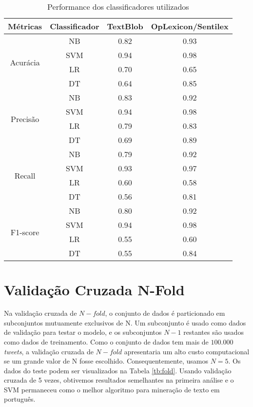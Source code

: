  
 \begin{table}[htbp]
     \centering
     \caption{Performance dos classificadores utilizados}
     \label{tb:metricas}
     \begin{tabular}{@{}cccc@{}}
     \\    \hline
     Métricas & Classificador & TextBlob & OpLexicon/Sentilex \\  \hline
     \multirow{4}{*}{Acurácia} & NB & 0.82 & 0.93 \\  
      & SVM & 0.94 & 0.98 \\ 
      & LR & 0.70 & 0.65 \\
      & DT & 0.64 & 0.85 \\ \hline
     \multirow{4}{*}{Precisão} & NB & 0.83 & 0.92 \\ 
      & SVM & 0.94 & 0.98 \\ 
      & LR & 0.79 & 0.83 \\ 
      & DT & 0.69 & 0.89 \\ \hline
     \multirow{4}{*}{Recall} & NB & 0.79 & 0.92 \\ 
      & SVM & 0.93 & 0.97 \\ 
      & LR & 0.60 & 0.58 \\ 
      & DT & 0.56 & 0.81 \\ \hline
     \multirow{4}{*}{F1-score} & NB & 0.80 & 0.92 \\ 
      & SVM & 0.94 & 0.98 \\ 
      & LR & 0.55 & 0.60 \\ 
      & DT & 0.55 & 0.84 \\ \hline
     \end{tabular}
     \end{table}
     
 \section{Validação Cruzada N-Fold}
 
 Na validação cruzada de $N-fold$, o conjunto de dados é
 particionado em subconjuntos mutuamente exclusivos de N.
 Um subconjunto é usado como dados de validação para testar
 o modelo, e os subconjuntos $N −1$ restantes são usados como
 dados de treinamento. Como o conjunto de dados tem mais
 de $100.000$ \textit{tweets}, a validação cruzada de $N-fold$ apresentaria
 um alto custo computacional se um grande valor de N fosse
 escolhido. Consequentemente, usamos $N = 5$. Os dados do
 teste podem ser visualizados na Tabela \ref{tb:fold}.
 Usando validação cruzada de 5 vezes, obtivemos resultados
 semelhantes na primeira análise e o SVM permaneceu como
 o melhor algoritmo para mineração de texto em português.
 
